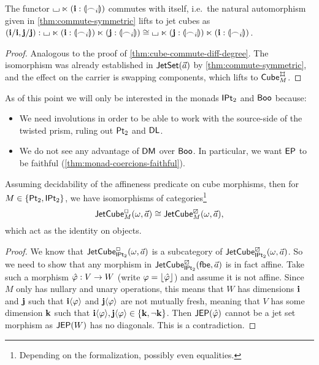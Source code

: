 \documentclass[a4paper]{memoir}
\begin{document}
\begin{proposition} \label{thm:cube-commute-symmetric}
	The functor ${\llcorner\hspace{-.4ex}\lrcorner} \ltimes (\mathbf{i} : {\llparenthesis \frown_i \rrparenthesis})$ commutes with itself, i.e.\ the natural automorphism given in \cref{thm:commute-symmetric} lifts to jet cubes as $(\mathbf{i} / \mathbf{i}, \mathbf{j} / \mathbf{j}) : {\llcorner\hspace{-.4ex}\lrcorner} \ltimes (\mathbf{i} : {\llparenthesis \frown_i \rrparenthesis}) \ltimes (\mathbf{j} : {\llparenthesis \frown_i \rrparenthesis}) \cong {\llcorner\hspace{-.4ex}\lrcorner} \ltimes (\mathbf{j} : {\llparenthesis \frown_i \rrparenthesis}) \ltimes (\mathbf{i} : {\llparenthesis \frown_i \rrparenthesis})$.
\end{proposition}
\begin{proof}
	Analogous to the proof of \cref{thm:cube-commute-diff-degree}.
	The isomorphism was already established in $\mathsf{JetSet}(\vec a)$ by \cref{thm:commute-symmetric}, and the effect on the carrier is swapping components, which lifts to $\cubecat_M^\mycubex$.
\end{proof}
\begin{remark} \label{rem:two-monads}
	As of this point we will only be interested in the monads ${\mathsf{IPt}_2}$ and $\mathsf{Boo}$ because:
	\begin{itemize}
		\item We need involutions in order to be able to work with the source-side of the twisted prism, ruling out ${\mathsf{Pt}_2}$ and $\mathsf{DL}$.
		\item We do not see any advantage of $\mathsf{DM}$ over $\mathsf{Boo}$. In particular, we want $\mathsf{EP}$ to be faithful (\cref{thm:monad-coercions-faithful}).
	\end{itemize}
\end{remark}
\begin{theorem} \label{thm:affine-automatic}
	Assuming decidability of the affineness predicate on cube morphisms, then for $M \in \mathopen{}\left\{ {\mathsf{Pt}_2}, {\mathsf{IPt}_2} \right\}\mathclose{}$, we have isomorphisms of categories\footnote{Depending on the formalization, possibly even equalities.}
	\[
		\mathsf{JetCube}^{\Box}_{M}\mathopen{}\left( \omega,\vec a \right)\mathclose{} \cong \mathsf{JetCube}^{\boxslash}_{M}\mathopen{}\left( \omega,\vec a \right)\mathclose{},
	\]
	which act as the identity on objects.
\end{theorem}
\begin{proof}
	We know that $\mathsf{JetCube}^{\Box}_{{\mathsf{IPt}_2}}\mathopen{}\left( \omega,\vec a \right)\mathclose{}$ is a subcategory of $\mathsf{JetCube}^{\boxslash}_{{\mathsf{IPt}_2}}\mathopen{}\left( \omega,\vec a \right)\mathclose{}$.
	So we need to show that any morphism in $\mathsf{JetCube}^{\boxslash}_{{\mathsf{IPt}_2}}\mathopen{}\left( {\mathsf{fbe}},\vec a \right)\mathclose{}$ is in fact affine.
	Take such a morphism $\hat {\varphi} : V \to W$ (write $\varphi = \mathopen{}\left\lfloor \hat {\varphi} \right\rfloor\mathclose{}$) and assume it is not affine.
	Since $M$ only has nullary and unary operations, this means that $W$ has dimensions $\mathbf{i}$ and $\mathbf{j}$ such that $\mathbf{i} \langle \varphi \rangle$ and $\mathbf{j} \langle \varphi \rangle$ are not mutually fresh, meaning that $V$ has some dimension $\mathbf{k}$ such that $\mathbf{i} \langle \varphi \rangle, \mathbf{j} \langle \varphi \rangle \in \mathopen{}\left\{ \mathbf{k}, \lnot \mathbf{k} \right\}\mathclose{}$.
	Then $\mathsf{JEP}(\hat {\varphi})$ cannot be a jet set morphism as $\mathsf{JEP}(W)$ has no diagonals. This is a contradiction.
\end{proof}
\end{document}
